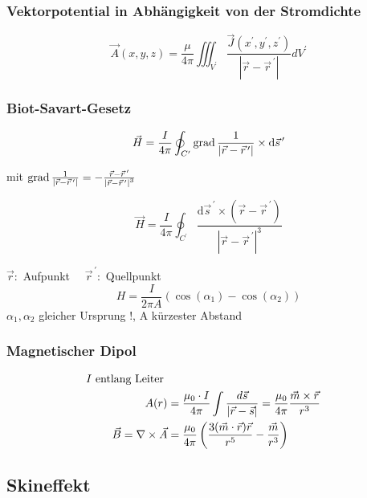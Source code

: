 \subsubsection{Vektorpotential in Abhängigkeit von der Stromdichte}
\[
    \vec{A}(x, y, z)=\frac{\mu}{4 \pi} \iiint_{V^{\prime}} \frac{\vec{J}\left(x^{\prime}, y^{\prime}, z^{\prime}\right)}{\left|\vec{r}-\vec{r}^{\,\prime}\right|} d V^{\prime}
\]

\subsubsection{Biot-Savart-Gesetz}
\[
    \vec{H}=\frac{I}{4 \pi} \oint_{C^{\prime}} \operatorname{grad} \frac{1}{\left|\vec{r}-\vec{r}^{\,\prime}\right|} \times \mathrm{d} \vec{s}^{\,\prime}
\]

mit $\operatorname{grad} \frac{1}{\left|\vec{r}-\vec{r}^{\,\prime}\right|}=-\frac{\vec{r}-\vec{r}^{\,\prime}}{\left|\vec{r}-\vec{r}^{\,\prime}\right|^{3}}$

\[
    \vec{H}=\frac{I}{4 \pi} \oint_{C^{\prime}} \frac{\mathrm{d} \vec{s}^{\,\prime} \times\left(\vec{r}-\vec{r}^{\,\prime}\right)}{\left|\vec{r}-\vec{r}^{\,\prime}\right|^{3}}
\]

{\footnotesize$\vec{r}:$ Aufpunkt $\quad \vec{r}^{\,\prime}:$ Quellpunkt}
\[
    H = \frac{I}{2 \pi A} ( \cos(\alpha_1) - \cos(\alpha_2))
\]
{\footnotesize$\alpha_1, \alpha_2$ gleicher Ursprung !, A kürzester Abstand}

\subsubsection{Magnetischer Dipol}


\begin{align*}
    I\textnormal{ entlang Leiter }                                                                                                                                        \\
    A(r)                            & = \frac{\mu_0 \cdot I}{4 \pi} \int \frac{d \vec{s}}{| \vec{r} - \vec{s}|} = \frac{ \mu_0}{4 \pi} \frac{\vec{m} \times \vec{r}}{r^3} \\
    \vec{B} = \nabla \times \vec{A} & = \frac{\mu_0}{4 \pi} \left(\frac{3(\vec{m} \cdot \vec{r})\vec{r}}{r^5} - \frac{\vec{m}}{r^3}\right)
\end{align*}

\newpage
\subsection{Skineffekt}

